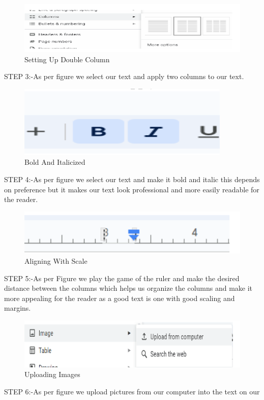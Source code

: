 \documentclass[a4paper,9pt]{article}
\begin{document}
\begin{enumerate}
	\begin{figure}[H]
		\centering
		\includegraphics[width=0.8\linewidth]{2.3.png}
		\caption{Setting Up Double Column}
	\end{figure}
	STEP 3:-As per figure we select our text and apply two columns to our text.
	 
	\begin{figure}[H]
		\centering
		\includegraphics[width=0.8\linewidth]{2.4.png}
		\caption{Bold And Italicized}
	\end{figure}
	STEP 4:-As per figure we select our text and make it bold and italic this depends on
	preference but it makes our text look professional and more easily readable for
	the reader.
	\begin{figure}[H]
		\centering
		\includegraphics[width=0.8\linewidth]{2.5.png}
		\caption{Aligning With Scale}
	\end{figure}
	STEP 5:-As per Figure we play the game of the ruler and make the desired distance
	between the columns which helps us organize the columns and make it more
	appealing for the reader as a good text is one with good scaling and margins.
	\begin{figure}[H]
		\centering
		\includegraphics[width=0.8\linewidth]{2.6.png}
		\caption{Uploading Images}
	\end{figure}
	STEP 6:-As per figure we upload pictures from our computer into the text on our

\end{enumerate}
\end{document}
